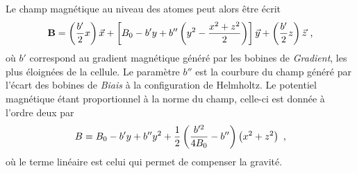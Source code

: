 Le champ magnétique au niveau des atomes peut alors être écrit
\begin{equation}
\mathbf{B}=\left( \frac{b'}{2}x \right) \vec{x} + \left[ B_0 - b'y + b'' \left( y^2 - \frac{x^2+z^2}{2} \right) \right] \vec{y} + \left( \frac{b'}{2}z \right) \vec{z} \text{ ,}
\end{equation}
où $b'$ correspond au gradient magnétique généré par les bobines de \emph{Gradient}, les plus éloignées de la cellule. Le  paramètre $b''$ est la courbure du champ généré par l'écart des bobines de \emph{Biais} à la configuration de Helmholtz. 
Le potentiel magnétique étant proportionnel à la norme du champ, celle-ci est donnée à l'ordre deux par
\begin{equation}
B=B_0 -b' y + b'' y^2 +\frac{1}{2} \left( \frac{b'^2}{4 B_0} - b'' \right) \left( x^2 + z^2 \right) \text{ ,}
\label{eq:norme_levitation}
\end{equation}
où le terme linéaire est celui qui permet de compenser la gravité.



